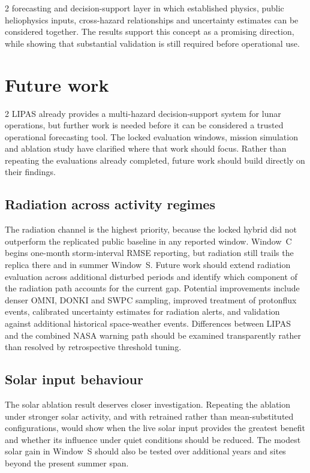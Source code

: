 \begin{multicols}{2}
forecasting and decision-support layer in which established physics, public heliophysics inputs, cross-hazard relationships and uncertainty estimates can be considered together. The results support this concept as a promising direction, while showing that substantial validation is still required before operational use.
\end{multicols}
\section{Future work}
\begin{multicols}{2}
LIPAS already provides a multi-hazard decision-support system for lunar operations, but further work is needed before it can be considered a trusted operational forecasting tool. The locked evaluation windows, mission simulation and ablation study have clarified where that work should focus. Rather than repeating the evaluations already completed, future work should build directly on their findings.

\subsection{Radiation across activity regimes}

The radiation channel is the highest priority, because the locked hybrid did not outperform the replicated public baseline in any reported window. Window~C begins one-month storm-interval RMSE reporting, but radiation still trails the replica there and in summer Window~S. Future work should extend radiation evaluation across additional disturbed periods and identify which component of the radiation path accounts for the current gap. Potential improvements include denser OMNI, DONKI and SWPC sampling, improved treatment of protonflux events, calibrated uncertainty estimates for radiation alerts, and validation against additional historical space-weather events. Differences between LIPAS and the combined NASA warning path should be examined transparently rather than resolved by retrospective threshold tuning.

\subsection{Solar input behaviour}

The solar ablation result deserves closer investigation. Repeating the ablation under stronger solar activity, and with retrained rather than mean-substituted configurations, would show when the live solar input provides the greatest benefit and whether its influence under quiet conditions should be reduced. The modest solar gain in Window~S should also be tested over additional years and sites beyond the present summer span.


\end{multicols}
